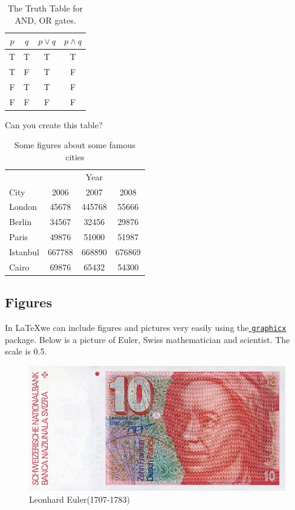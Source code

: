 \documentclass[a4paper,11pt]{article}
\begin{document}
\begin{table}[h]
\centering
\begin{tabular}{c|c|c|c}
$p$ & $q$ & $p \vee q$ & $p \wedge q$ \\
\hline
\hline
T & T & T & T \\
T & F & T & F \\
F & T & T & F \\
F & F & F & F\\
\end{tabular}
\caption{The Truth Table for AND, OR gates.}
\end{table}

Can you create this table?
\begin{table}[h]
\centering
\begin{tabular}{l|c c c}
 &  &Year \\
\cline{2-4}
City & 2006 & 2007 & 2008 \\
\hline
London & 45678 & 445768 & 55666\\
Berlin & 34567 & 32456 & 29876\\
Paris & 49876 & 51000 & 51987 \\
Istanbul& 667788 & 668890 & 676869\\
Cairo & 69876 & 65432 & 54300\\
\hline
\end{tabular}
\caption{Some figures about some famous cities}
\end{table}

\subsection{Figures}
In \LaTeX we can include figures and pictures very easily using the\underline{ \texttt{graphicx}} package. Below is a picture of Euler, Swiss mathematician and scientist. The scale is 0.5.
\begin{figure}[h]
\centering
\includegraphics[scale=0.5]{Euler}
\caption{Leonhard Euler(1707-1783)}
\end{figure}
\end{document}
